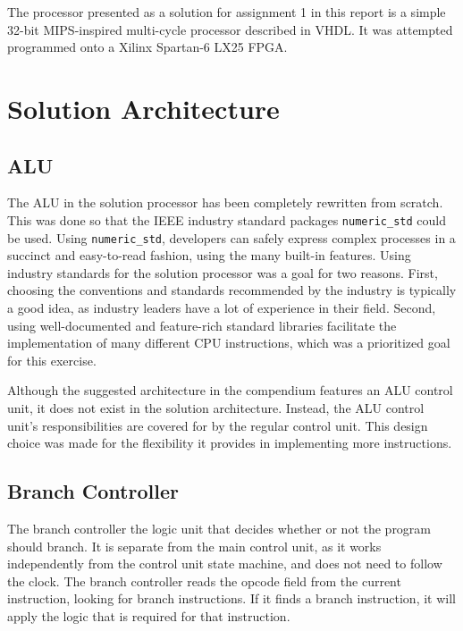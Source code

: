 The processor presented as a solution for assignment 1 in this report is a simple 32-bit MIPS-inspired multi-cycle processor described in VHDL.
It was attempted programmed onto a Xilinx Spartan-6 LX25 FPGA.

\section{Solution Architecture}



\subsection{ALU}

The ALU in the solution processor has been completely rewritten from scratch.
This was done so that the IEEE industry standard packages \texttt{numeric\_std} could be used.
Using \texttt{numeric\_std}, developers can safely express complex processes in a succinct and easy-to-read fashion, using the many built-in features.
Using industry standards for the solution processor was a goal for two reasons.
First, choosing the conventions and standards recommended by the industry is typically a good idea, as industry leaders have a lot of experience in their field.
Second, using well-documented and feature-rich standard libraries facilitate the implementation of many different CPU instructions, which was a prioritized goal for this exercise.

Although the suggested architecture in the compendium features an ALU control unit\cite{compendium}, it does not exist in the solution architecture.
Instead, the ALU control unit's responsibilities are covered for by the regular control unit.
This design choice was made for the flexibility it provides in implementing more instructions.

\subsection{Branch Controller}

The branch controller the logic unit that decides whether or not the program should branch.
It is separate from the main control unit, as it works independently from the control unit state machine, and does not need to follow the clock.
The branch controller reads the opcode field from the current instruction, looking for branch instructions.
If it finds a branch instruction, it will apply the logic that is required for that instruction.


